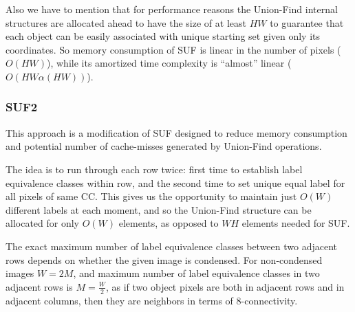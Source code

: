 \documentclass[hidelinks]{llncs}
\newcommand{\texten}[1]{#1}
\newcommand{\textru}[1]{}
\begin{document}
\texten{
Also we have to mention that for performance reasons the Union-Find internal
structures are allocated ahead to have the size of at least $HW$ to guarantee
that each object can be easily associated with unique starting set given only
its coordinates. So memory consumption of SUF is linear in the number of pixels
($O(HW)$), while its amortized time complexity is ``almost'' linear
($O(HW\alpha(HW))$).
}\textru{
Также необходимо отметить, что для лучшей производительности служебные массивы
структуры Union-Find заранее выделяются размера как минимум $HW$, чтобы
обеспечить простоту соответствия между пикселями изображения и элементами в
системе множеств.
Таким образом, SUF использует линейное от числа пикселей количество памяти
$O(HW)$.
}

\subsubsection{SUF2}

\texten{
This approach is a modification of SUF designed to reduce memory consumption
and potential number of cache-misses generated by Union-Find operations.
}\textru{
Этот подход~--- модификация SUF, предложенная, чтобы сократить потребление
памяти и предположительно сильно уменьшить число кэш-промахов, происходящих
из-за произвольного доступа к большим массивам структуры Union-Find.
}

\texten{
The idea is to run through each row twice: first time to establish label
equivalence classes within row, and the second time to set unique equal label
for all pixels of same CC. This gives us the opportunity to maintain just $O(W)$
different labels at each moment, and so the Union-Find structure can be
allocated for only $O(W)$ elements, as opposed to $WH$ elements needed for SUF.
}\textru{
Идея в том, чтобы бежать по каждой строке дважды: один раз чтобы установить
классы эквивалентности меток в текущей и предыдущей строках, и второй раз, чтобы
расставить уникальные метки в пиксели каждого класса.
Это даёт нам возможность иметь не более $O(W)$ различных меток в каждый момент
времени, и поэтому Union-Find можно выделять размера всего $O(W)$, при том что в
SUF выделялось ровно $WH$ элементов.
}

\texten{
The exact maximum number of label equivalence classes between two adjacent rows
depends on whether the given image is condensed. For non-condensed images
$W=2M$, and maximum number of label equivalence classes in two adjacent rows is
$M=\frac{W}2$, as if two object pixels are both in adjacent rows and in adjacent
columns, then they are neighbors in terms of 8-connectivity.
}\textru{
Точная оценка на максимальное число классов эквивалентности меток в двух
соседних строках зависит от того, сжатое изображение поступило на вход, или нет.
Для несжатых изображений $W=2M$, и наибольшее число классов эквивалентности в
соседних строках равно $M=\frac{W}2$, так как если два объектных пикселя
находятся одновременно в соседних строках и соседних столбцах, то они соседи в
смысле 8-связности.
}
\end{document}
